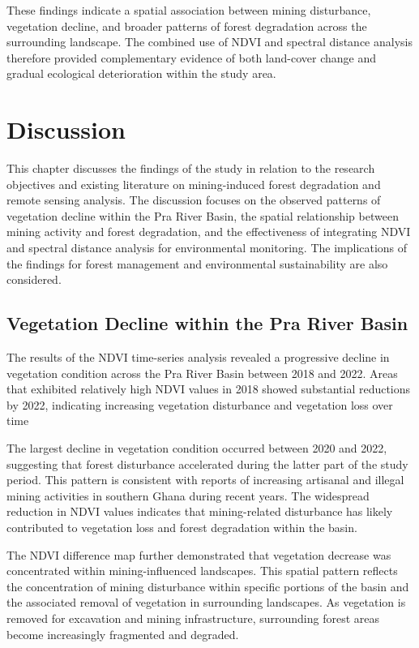 \documentclass[a4paper,12pt]{report}
\begin{document}
These findings indicate a spatial association between mining disturbance, vegetation decline, and broader patterns of forest degradation across the surrounding landscape. The combined use of NDVI and spectral distance analysis therefore provided complementary evidence of both land-cover change and gradual ecological deterioration within the study area.

\FloatBarrier

\chapter{Discussion}

This chapter discusses the findings of the study in relation to the research objectives and existing literature on mining-induced forest degradation and remote sensing analysis. The discussion focuses on the observed patterns of vegetation decline within the Pra River Basin, the spatial relationship between mining activity and forest degradation, and the effectiveness of integrating NDVI and spectral distance analysis for environmental monitoring. The implications of the findings for forest management and environmental sustainability are also considered.

\section{Vegetation Decline within the Pra River Basin}

The results of the NDVI time-series analysis revealed a progressive decline in vegetation condition across the Pra River Basin between 2018 and 2022. Areas that exhibited relatively high NDVI values in 2018 showed substantial reductions by 2022, indicating increasing vegetation disturbance and vegetation loss over time \citep{asner2005selective,sonter2017mining,hilson2002environmental}

The largest decline in vegetation condition occurred between 2020 and 2022, suggesting that forest disturbance accelerated during the latter part of the study period. This pattern is consistent with reports of increasing artisanal and illegal mining activities in southern Ghana during recent years. The widespread reduction in NDVI values indicates that mining-related disturbance has likely contributed to vegetation loss and forest degradation within the basin.

The NDVI difference map further demonstrated that vegetation decrease was concentrated within mining-influenced landscapes. This spatial pattern reflects the concentration of mining disturbance within specific portions of the basin and the associated removal of vegetation in surrounding landscapes. As vegetation is removed for excavation and mining infrastructure, surrounding forest areas become increasingly fragmented and degraded.
\end{document}
